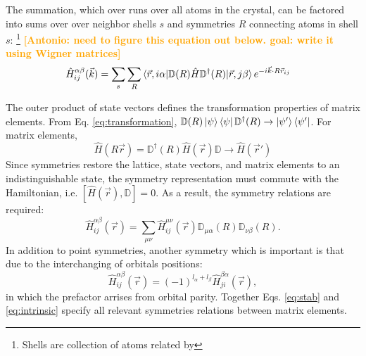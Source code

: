 \documentclass[twocolumn,showpacs,preprintnumbers,superscriptaddress,prb,floatfix,aps,10pt]{revtex4-1}
\newcommand{\abmei}[1]{\textcolor{orange}{ \bf [Antonio: #1] }}
\newcommand*{\ham}{\hat{H}}
\newcommand*{\wignerD}{\mathbb{D}}%
\begin{document}
The summation, which over runs over all atoms in the crystal, can be factored into sums over over neighbor shells $s$ and symmetries $R$ connecting atoms in shell $s$: \footnote{Shells are collection of atoms related by  }
%
\abmei{need to figure this equation out below. goal: write it using Wigner matrices}
\begin{align}
\label{eq:matrix_element_shell}
\ham^{\alpha\beta}_{ij}(\vec{k}) 
&= \sum_s \sum_{R} \braket{\vec{r},i\alpha | \wignerD(R) \ham \wignerD^\dag(R) | \vec{r},j\beta} e^{-i \vec{k} \cdot R\vec{r}_{ij} }
\end{align}
%


The outer product of state vectors defines the transformation properties of matrix elements. From Eq. \ref{eq:transformation}, $ \mathbb{D}(R)\ket{\psi}\bra{\psi}\mathbb{D}^\dag(R) \rightarrow \ket{\psi'}\bra{\psi'}$. For matrix elements, \cite{el-batanouny_symmetry_2008}
\begin{equation}
\label{eq:transformation_matrix}
\ham( R\vec{r}) = \mathbb{D}^\dag(R) \ham(\vec{r}) \wignerD \rightarrow \ham(\vec{r}')
\end{equation}
%
Since symmetries restore the lattice, state vectors, and matrix elements to an indistinguishable state, the symmetry representation must commute with the Hamiltonian, i.e. $[\ham(\vec{r}),\wignerD] = 0$. As a result, the symmetry relations are required:
\begin{equation}
\label{eq:stab}
\ham^{\alpha\beta}_{ij}(\vec{r}) = \sum_{\mu\nu} \ham^{\mu\nu}_{ij}(\vec{r}) \mathbb{D}_{\mu\alpha}(R) \mathbb{D}_{\nu\beta}(R).
\end{equation}
%
In addition to point symmetries, another symmetry which is important is that due to the interchanging of orbitals positions:
%
\begin{equation}
\label{eq:intrinsic}
\ham^{\alpha\beta}_{ij}(\vec{r}) = (-1)^{l_\alpha+l_\beta} \ham^{\beta\alpha}_{ji}(\vec{r}),
\end{equation}
%
in which the prefactor arrises from orbital parity. Together Eqs. \ref{eq:stab} and \ref{eq:intrinsic} specify all relevant symmetries relations between matrix elements.









 
\end{document}
